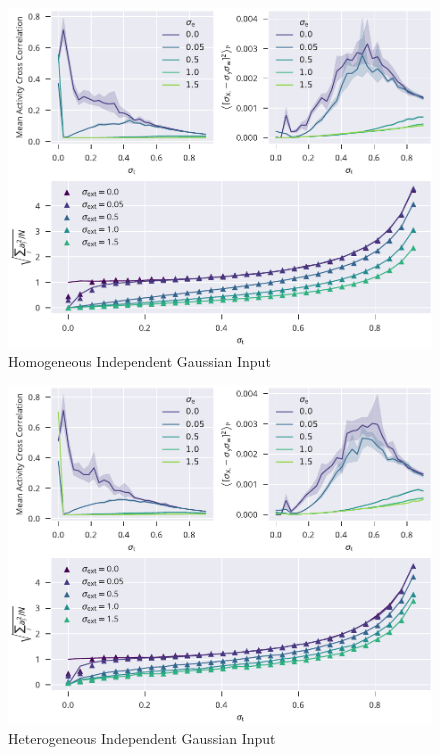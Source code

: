 \documentclass[10pt,a4paper]{article}
\author{Fabian Schubert}
\begin{document}
	\begin{figure}[h]
		\includegraphics{../plots/homogeneous_independent_gaussian_input_compos.pdf}
		\caption{Homogeneous Independent Gaussian Input}
	\end{figure}
	\begin{figure}[h!]
		\includegraphics{../plots/heterogeneous_independent_gaussian_input_compos.pdf}
		\caption{Heterogeneous Independent Gaussian Input}
	\end{figure}
\end{document}
